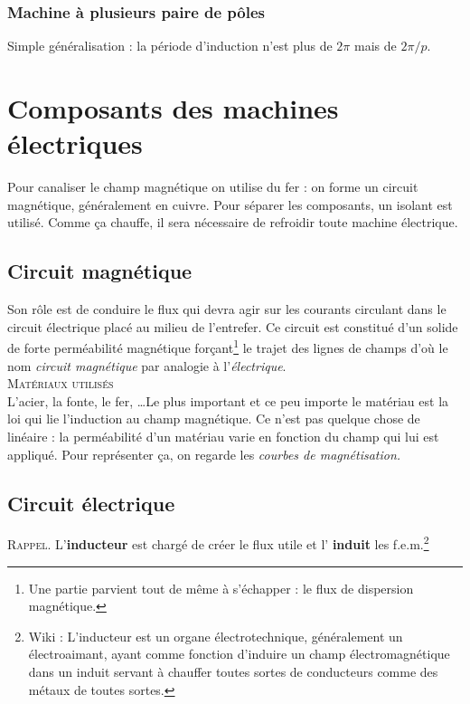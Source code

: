 		\subsubsection{Machine à plusieurs paire de pôles}
		Simple généralisation : la période d'induction n'est plus de $2\pi$ mais 
		de $2\pi/p$.
		
		
		
\section{Composants des machines électriques}
Pour canaliser le champ magnétique on utilise du fer : on forme un circuit 
magnétique, généralement en cuivre. Pour séparer les composants, un isolant 
est utilisé. Comme ça chauffe, il sera nécessaire de refroidir toute machine 
électrique.

	\subsection{Circuit magnétique}
	Son rôle est de conduire le flux qui devra agir sur les courants circulant 
	dans le circuit électrique placé au milieu de l'entrefer. Ce circuit est 
	constitué d'un solide de forte perméabilité magnétique forçant\footnote{Une 
	partie parvient tout de même à s'échapper : le flux de dispersion magnétique.} 
	le trajet des lignes de champs d'où le nom \textit{circuit magnétique} par analogie 
	à l'\textit{électrique}.\\
	
	\textsc{Matériaux utilisés}\\
	L'acier, la fonte, le fer, \dots Le plus important et ce peu importe le 
	matériau est la loi qui lie l'induction au champ magnétique. Ce n'est 
	pas quelque chose de linéaire : la perméabilité d'un matériau varie en 
	fonction du champ qui lui est appliqué. Pour représenter ça, on regarde 
	les \textit{courbes de magnétisation.}
	
	
	\subsection{Circuit électrique}
	\textsc{Rappel.} L'\textbf{inducteur} est chargé de créer le flux utile et l'
	\textbf{induit} les f.e.m.\footnote{Wiki : L'inducteur est un organe 
	électrotechnique, généralement un électroaimant, ayant comme fonction d'induire 
	un champ électromagnétique dans un induit servant à chauffer toutes sortes de 
	conducteurs comme des métaux de toutes sortes.}
	
